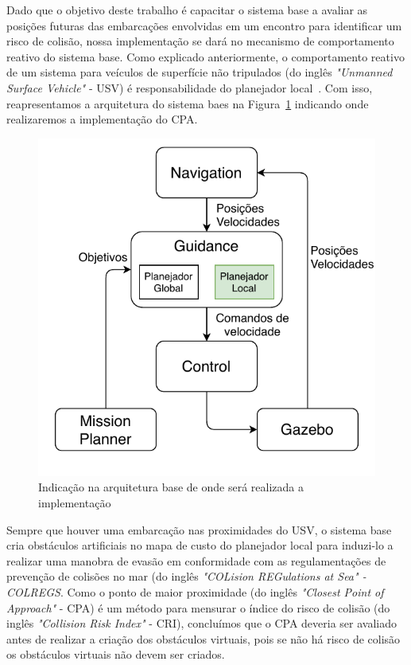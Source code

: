     
    
    Dado que o objetivo deste trabalho é capacitar o sistema base a avaliar as posições futuras das embarcações envolvidas em um encontro para identificar um risco de colisão, nossa implementação se dará no mecanismo de comportamento reativo do sistema base. Como explicado anteriormente, o comportamento reativo de um sistema para veículos de superfície não tripulados (do inglês \textit{"Unmanned Surface Vehicle"} - USV) é responsabilidade do planejador local~\cite{Jurak2020COLREGS}. Com isso, reapresentamos a arquitetura do sistema baes na Figura~\ref{fig:chap4_onde_implementar_cpa} indicando onde realizaremos a implementação do CPA.
    
    
    \begin{figure}
        \centering
        \includegraphics{fig/chap4/onde_implementar_cpa.pdf}
        \caption{Indicação na arquitetura base de onde será realizada a implementação}
        \label{fig:chap4_onde_implementar_cpa}
    \end{figure}
    
    Sempre que houver uma embarcação nas proximidades do USV, o sistema base cria obstáculos artificiais no mapa de custo do planejador local para induzi-lo a realizar uma manobra de evasão em conformidade com as regulamentações de prevenção de colisões no mar (do inglês \textit{"COLision REGulations at Sea" - COLREGS}. Como o ponto de maior proximidade (do inglês \textit{"Closest Point of Approach"} - CPA) 
    é um método para mensurar o índice do risco de colisão (do inglês \textit{"Collision Risk Index"} - CRI), concluímos que o CPA deveria ser avaliado antes de realizar a criação dos obstáculos virtuais, pois se não há risco de colisão os obstáculos virtuais não devem ser criados.
    
